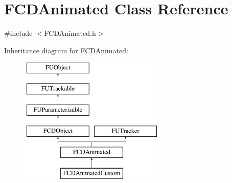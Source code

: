 \hypertarget{classFCDAnimated}{
\section{FCDAnimated Class Reference}
\label{classFCDAnimated}
}


{\ttfamily \#include $<$FCDAnimated.h$>$}

Inheritance diagram for FCDAnimated:\begin{figure}[H]
\begin{center}
\leavevmode
\includegraphics[height=6.000000cm]{classFCDAnimated}
\end{center}
\end{figure}
